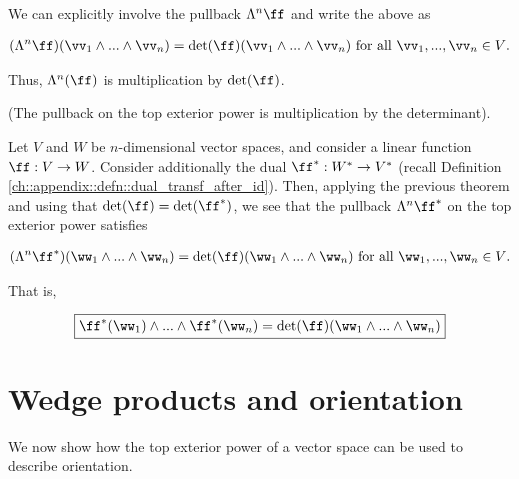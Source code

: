 \begin{deriv}
   We can explicitly involve the pullback $\Lambda^n \ff$ and write the above as
   
   \begin{align*}
       (\Lambda^n \ff)(\vv_1 \wedge ... \wedge \vv_n) = \det(\ff) ( \vv_1 \wedge ... \wedge \vv_n ) \text{ for all $\vv_1, ..., \vv_n \in V$}.
   \end{align*}
   
   Thus, $\Lambda^n(\ff)$ is multiplication by $\det(\ff)$.
\end{deriv}

\begin{theorem}
\label{ch::exterior_powers::rmk::top_pullback_det}

    (The pullback on the top exterior power is multiplication by the determinant).
    
    Let $V$ and $W$ be $n$-dimensional vector spaces, and consider a linear function $\ff:V \rightarrow W$. Consider additionally the dual $\ff^*:W^* \rightarrow V^*$ (recall Definition \ref{ch::appendix::defn::dual_transf_after_id}). Then, applying the previous theorem and using that $\det(\ff) = \det(\ff^*)$, we see that the pullback $\Lambda^n \ff^*$ on the top exterior power satisfies
    
    \begin{align*}
        (\Lambda^n \ff^*)(\ww_1 \wedge ... \wedge \ww_n) = \det(\ff) ( \ww_1 \wedge ... \wedge \ww_n ) \text{ for all $\ww_1, ..., \ww_n \in V$}.
    \end{align*}
    
    That is,
    
    \begin{align*}
        \boxed
        {
            \ff^*(\ww_1) \wedge ... \wedge \ff^*(\ww_n) = \det(\ff)(\ww_1 \wedge ... \wedge \ww_n)
        }
    \end{align*}
\end{theorem}

\section{Wedge products and orientation}

We now show how the top exterior power of a vector space can be used to describe orientation. 


